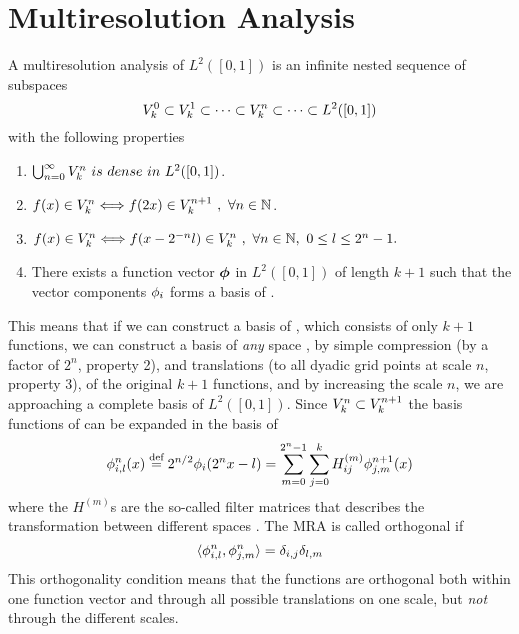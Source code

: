 \section{Multiresolution Analysis}
A multiresolution analysis of $L^2([0,1])$ is an infinite nested sequence of subspaces
\begin{equation}
    \label{eq:MRA}
    {V}_{k}^{0}\subset {V}_{k}^{1}\subset \cdots \subset 
	{V}_{k}^{n}\subset \cdots \subset L^2([0,1])
\end{equation}
with the following properties
\begin{enumerate}
    \item $\bigcup_{n=0}^{\infty}\scalingspace{n}\ is\ dense\ in\ L^2([0,1])$.
    \item $f(x) \in {V}_{k}^{n} \Longleftrightarrow f(2x) \in {V}_{k}^{n+1}
    	\ ,\ \forall n \in \mathbb{N}$.
    \item $f(x) \in {V}_{k}^{n} \Longleftrightarrow f(x-2^{-n}l) \in 
	{V}_{k}^{n}\ ,\ \forall n \in \mathbb{N},\ 0 \leq l \leq 2^n - 1.$
    \item There exists a function vector $\boldsymbol{\phi}$ in $L^2([0,1])$ of length
	$k+1$ such that the vector components $\phi_i$ forms a basis of 
	. 
\end{enumerate}
This means that if we can construct a basis of , which consists of 
only $k+1$ functions, we can construct a basis of \emph{any} space , 
by simple compression (by a factor of $2^n$, property 2), and translations (to all 
dyadic grid points at scale $n$, property 3), of the original $k+1$ functions, and 
by increasing the scale $n$, we are approaching a complete basis of $L^2([0,1])$. 
Since ${V}_{k}^{n} \subset {V}_{k}^{n+1}$ the basis functions of 
 can be expanded in the basis of 
\begin{equation}
    \label{eq:twoscalescaling}
    \phi^n_{i,l}(x) \stackrel{\text{def}}{\hbox{=}} 2^{n/2}\phi_i(2^nx-l) = 
	\sum_{m=0}^{2^n-1} \sum_{j=0}^k H_{ij}^{(m)} \phi^{n+1}_{j,m}(x)
\end{equation}
where the $H^{(m)}$s are the so-called filter matrices that describes the 
transformation between different spaces . The MRA is called 
orthogonal if 
\begin{equation}
    \label{eq:orthogonality}
    \langle \phi_{i,l}^n, \phi_{j,m}^n \rangle = \delta_{i,j}\delta_{l,m}
\end{equation}
This orthogonality condition means that the 
functions are orthogonal both within one function vector and through all 
possible translations on one scale, but \emph{not} through the different scales.

